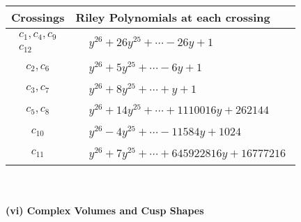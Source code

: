 \documentclass[1p]{elsarticle_modified}
\theoremstyle{definition}
\begin{document}
\begin{tabular}{m{50pt}|m{274pt}}
Crossings & \hspace{64pt}Riley Polynomials at each crossing \\
\hline $$\begin{aligned}c_{1},c_{4},c_{9}\\c_{12}\end{aligned}$$&$\begin{aligned}
&y^{26}+26 y^{25}+\cdots-26 y+1
\end{aligned}$\\
\hline $$\begin{aligned}c_{2},c_{6}\end{aligned}$$&$\begin{aligned}
&y^{26}+5 y^{25}+\cdots-6 y+1
\end{aligned}$\\
\hline $$\begin{aligned}c_{3},c_{7}\end{aligned}$$&$\begin{aligned}
&y^{26}+8 y^{25}+\cdots+y+1
\end{aligned}$\\
\hline $$\begin{aligned}c_{5},c_{8}\end{aligned}$$&$\begin{aligned}
&y^{26}+14 y^{25}+\cdots+1110016 y+262144
\end{aligned}$\\
\hline $$\begin{aligned}c_{10}\end{aligned}$$&$\begin{aligned}
&y^{26}-4 y^{25}+\cdots-11584 y+1024
\end{aligned}$\\
\hline $$\begin{aligned}c_{11}\end{aligned}$$&$\begin{aligned}
&y^{26}+7 y^{25}+\cdots+645922816 y+16777216
\end{aligned}$\\
\hline
\end{tabular}\\~\\
\newpage\flushleft \textbf{(vi) Complex Volumes and Cusp Shapes}
\end{document}
